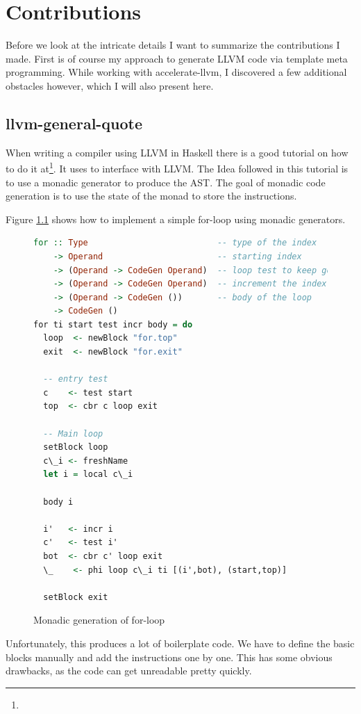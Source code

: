 \documentclass[a4paper,bibliography=totocnumbered,parskip,headsepline]{scrbook}
\begin{document}
\chapter{Contributions}
Before we look at the intricate details I want to summarize the contributions I made.
First is of course my approach to generate LLVM code via template meta programming.
While working with accelerate-llvm, I discovered a few additional obstacles however, which I will also present here.

\section{llvm-general-quote}
When writing a compiler using LLVM in Haskell there is a good tutorial on how to do it at\footnote{}.
It uses  to interface with LLVM.
The Idea followed in this tutorial is to use a monadic generator to produce the AST.
The goal of monadic code generation is to use the state of the monad to store the instructions.

Figure \ref{fig:formonad} shows how to implement a simple for-loop using monadic generators.
\begin{figure}
\begin{lstlisting}[language=haskell]
for :: Type                          -- type of the index
    -> Operand                       -- starting index
    -> (Operand -> CodeGen Operand)  -- loop test to keep going
    -> (Operand -> CodeGen Operand)  -- increment the index
    -> (Operand -> CodeGen ())       -- body of the loop
    -> CodeGen ()
for ti start test incr body = do
  loop  <- newBlock "for.top"
  exit  <- newBlock "for.exit"

  -- entry test
  c    <- test start
  top  <- cbr c loop exit

  -- Main loop
  setBlock loop
  c\_i <- freshName
  let i = local c\_i

  body i

  i'   <- incr i
  c'   <- test i'
  bot  <- cbr c' loop exit
  \_    <- phi loop c\_i ti [(i',bot), (start,top)]

  setBlock exit
\end{lstlisting}
\caption{Monadic generation of for-loop}
\label{fig:formonad}
\end{figure}

Unfortunately, this produces a lot of boilerplate code.
We have to define the basic blocks manually and add the instructions one by one.
This has some obvious drawbacks, as the code can get unreadable pretty quickly.
\end{document}
